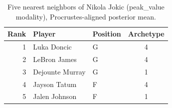 \begin{table}[htbp]
  \centering\small
  \begin{tabular}{rllc}
    \toprule
    Rank & Player & Position & Archetype \\
    \midrule
    1 & Luka Doncic & G & 4 \\
    2 & LeBron James & G & 4 \\
    3 & Dejounte Murray & G & 1 \\
    4 & Jayson Tatum & F & 4 \\
    5 & Jalen Johnson & F & 1 \\
    \bottomrule
  \end{tabular}
  \caption{Five nearest neighbors of Nikola Jokic (peak_value modality), Procrustes-aligned posterior mean.}
  \label{tab:Nikola_Jokic_neighbors_peak_value}
\end{table}


